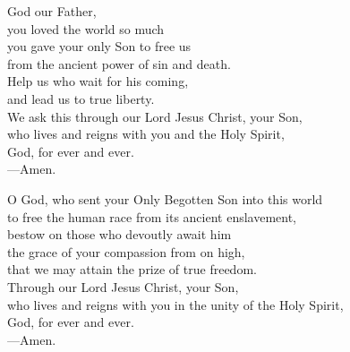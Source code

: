\prayer


\begin{prayerverse}
God our Father,\\
you loved the world so much\\
you gave your only Son to free us\\
from the ancient power of sin and death.\\
Help us who wait for his coming,\\
and lead us to true liberty.\\
We ask this through our Lord Jesus Christ, your Son,\\
who lives and reigns with you and the Holy Spirit,\\
God, for ever and ever.\\
{\color{red}---\thinspace}Amen.
\end{prayerverse}


\begin{prayerverse}
O God, who sent your Only Begotten Son into this world\\
to free the human race from its ancient enslavement,\\
bestow on those who devoutly await him\\
the grace of your compassion from on high,\\
that we may attain the prize of true freedom.\\
Through our Lord Jesus Christ, your Son,\\
who lives and reigns with you in the unity of the Holy Spirit,\\
God, for ever and ever.\\
{\color{red}---\thinspace}Amen.
\end{prayerverse}

